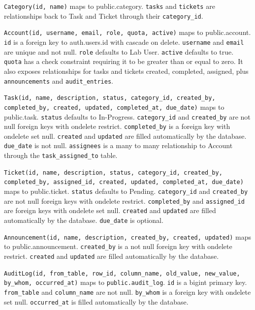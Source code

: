 \documentclass[12pt,letterpaper]{article}
\begin{document}
\texttt{Category(id, name)} maps to public.category. \texttt{tasks} and
\texttt{tickets} are relationships back to Task and Ticket through their
\texttt{category\_id}.

\texttt{Account(id, username, email, role, quota, active)} maps to
public.account. \texttt{id} is a foreign key to auth.users.id with cascade on
delete. \texttt{username} and \texttt{email} are unique and not null.
\texttt{role} defaults to Lab User. \texttt{active} defaults to true.
\texttt{quota} has a check constraint requiring it to be greater than or equal
to zero. It also exposes relationships for tasks and tickets created,
completed, assigned, plus \texttt{announcements} and \texttt{audit\_entries}.

\texttt{Task(id, name, description, status, category\_id, created\_by,
completed\_by, created, updated, completed\_at, due\_date)} maps to public.task.
\texttt{status} defaults to In-Progress. \texttt{category\_id} and
\texttt{created\_by} are not null foreign keys with ondelete restrict.
\texttt{completed\_by} is a foreign key with ondelete set null.
\texttt{created} and \texttt{updated} are filled automatically by the database.
\texttt{due\_date} is not null. \texttt{assignees} is a many to many
relationship to Account through the \texttt{task\_assigned\_to} table.

\texttt{Ticket(id, name, description, status, category\_id, created\_by,
completed\_by, assigned\_id, created, updated, completed\_at, due\_date)} maps
to public.ticket. \texttt{status} defaults to Pending. \texttt{category\_id}
and \texttt{created\_by} are not null foreign keys with ondelete restrict.
\texttt{completed\_by} and \texttt{assigned\_id} are foreign keys with ondelete
set null. \texttt{created} and \texttt{updated} are filled automatically by the
database. \texttt{due\_date} is optional.

\texttt{Announcement(id, name, description, created\_by, created, updated)}
maps to public.announcement. \texttt{created\_by} is a not null foreign key
with ondelete restrict. \texttt{created} and \texttt{updated} are filled
automatically by the database.

\texttt{AuditLog(id, from\_table, row\_id, column\_name, old\_value,
new\_value, by\_whom, occurred\_at)} maps to \texttt{public.audit\_log}.
\texttt{id} is a bigint primary key. \texttt{from\_table} and
\texttt{column\_name} are not null. \texttt{by\_whom} is a foreign key with
ondelete set null. \texttt{occurred\_at} is filled automatically by the
database.
\end{document}
